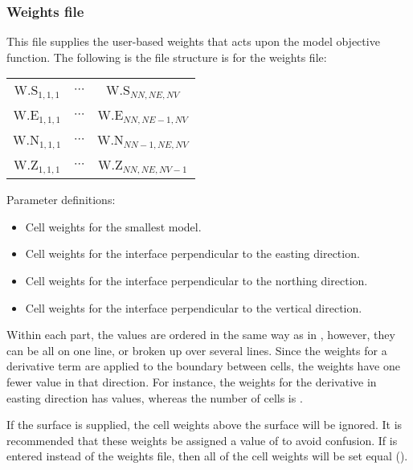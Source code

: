 \subsubsection{Weights file}
This file supplies the user-based weights that acts upon the model objective function. The following is the file structure is for the weights file:

\begin{fileExample}
\begin{tabular}{|ccc|}
\hline
W.S$_{1,1,1}$ & $\cdots$ & W.S$_{NN,NE,NV}$   \\
W.E$_{1,1,1}$ & $\cdots$ & W.E$_{NN,NE-1,NV}$ \\
W.N$_{1,1,1}$ & $\cdots$ & W.N$_{NN-1,NE,NV}$ \\
W.Z$_{1,1,1}$ & $\cdots$ & W.Z$_{NN,NE,NV-1}$ \\
\hline
\end{tabular}
\end{fileExample}

Parameter definitions:
\begin{itemize}
\item[\codeName{W.S$_{i,j,k}$}] Cell weights for the smallest model.
\item[\codeName{W.E$_{i,j,k}$}] Cell weights for the interface perpendicular to the easting direction.
\item[\codeName{W.N$_{i,j,k}$}] Cell weights for the interface perpendicular to the northing direction.
\item[\codeName{W.Z$_{i,j,k}$}] Cell weights for the interface perpendicular to the vertical direction.
\end{itemize}

Within each part, the values are ordered in the same way as in , however, they can be all on one line, or broken up over several lines. Since the weights for a derivative term are applied to the boundary between cells, the weights have one fewer value in that direction. For instance, the weights for the derivative in easting direction has  values, whereas the number of cells is .

If the surface  is supplied, the cell weights above the surface will be ignored. It is recommended that these weights be assigned a value of  to avoid confusion. If  is entered instead of the weights file, then all of the cell weights will be set equal ().